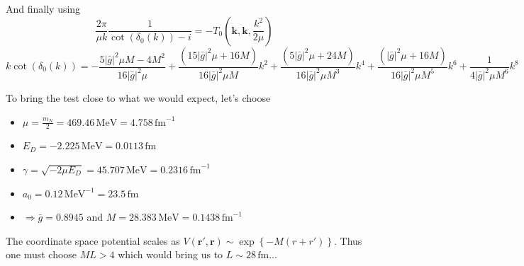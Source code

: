 \documentclass[
    aps,
    prl,
    showkeys,
    nofootinbib,
    floatfix
]{revtex4-1}
\renewcommand{\vec}[1]{\boldsymbol{#1}}
\newcommand{\fm}{\,\mathrm{fm}}
\newcommand{\ifm}{\,\mathrm{fm}^{-1}}
\newcommand{\MeV}{\,\mathrm{MeV}}
\begin{document}
And finally using 
\begin{equation}
	\frac{2 \pi}{ \mu k } \frac{1}{\cot(\delta_0(k)) - i} = - T_0\left(\vec k, \vec k, \frac{k^2}{2 \mu} \right) 
\end{equation}
\begin{equation}
	k \cot( \delta_0(k))
	=
	-\frac{5 |\bar g|^2 \mu  M-4 M^2}{16 |\bar g|^2 \mu }
	+\frac{ \left(15 |\bar g|^2 \mu + 16 M\right)}{16 |\bar g|^2 \mu M}k^2
	+\frac{ \left(5 |\bar g|^2 \mu + 24 M\right)}{16 |\bar g|^2\mu  M^3}k^4
	+\frac{ \left(|\bar g|^2 \mu + 16 M\right)}{16|\bar g|^2 \mu  M^5}k^6
	+\frac{1}{4 |\bar g|^2 \mu  M^6}k^8
\end{equation}

To bring the test close to what we would expect, let's choose
\begin{itemize}
	\item $\mu = \frac{m_N}{2} = 469.46 \MeV = 4.758 \ifm$
	\item $E_D = -2.225 \MeV = 0.0113 \fm$
	\item $\gamma = \sqrt{- 2 \mu E_D} = 45.707 \MeV = 0.2316 \ifm$
	\item $a_0 = 0.12 \MeV^{-1} = 23.5 \fm$
	\item $\Rightarrow \bar g = 0.8945$ and $ M = 28.383 \MeV= 0.1438 \ifm$
\end{itemize}
The coordinate space potential scales as $V(\vec r', \vec r) \sim \exp \left\{ - M (r + r')\right\}$. Thus one must choose $M L > 4$ which would bring us to $L \sim 28 \fm$...
\end{document}
